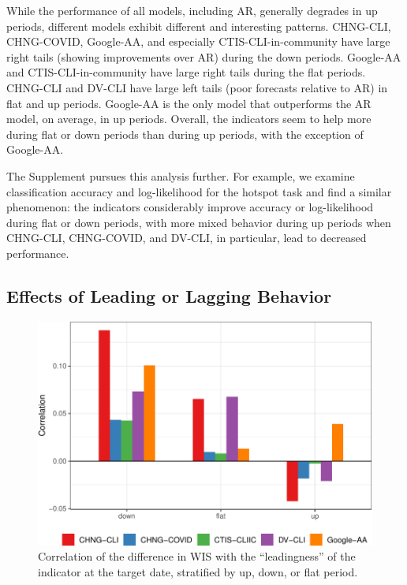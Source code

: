 \documentclass[9pt,twocolumn,twoside,lineno]{pnas-new}
\begin{document}
While the performance of all models, including AR, generally degrades in up
periods, different models exhibit different and interesting patterns. CHNG-CLI,
CHNG-COVID, Google-AA, and especially CTIS-CLI-in-community have large right
tails (showing improvements over AR) during the down periods.  Google-AA and
CTIS-CLI-in-community have large right tails during the flat periods. CHNG-CLI
and DV-CLI have large left tails (poor forecasts relative to AR) in flat and up
periods.  Google-AA is the only model that outperforms the AR model, on average,
in up periods.  Overall, the indicators seem to help more during flat or down
periods than during up periods, with the exception of Google-AA.

The Supplement pursues this analysis further.  For example, we examine
classification accuracy and log-likelihood for the hotspot task and find a
similar phenomenon: the indicators considerably improve accuracy or
log-likelihood during flat or down periods, with more mixed behavior during up
periods when CHNG-CLI, CHNG-COVID, and DV-CLI, in particular, lead to decreased  
performance.

\subsection{Effects of Leading or Lagging Behavior}
\label{sec:leading-lagging}

\begin{figure}[t]
  \includegraphics[width=\columnwidth]{fig/leading-only-1.pdf}
  \caption{Correlation of the difference in WIS with the ``leadingness'' of the
    indicator at the target date, stratified by up, down, or flat period.} 
  \label{fig:leading}
\end{figure}
\end{document}
